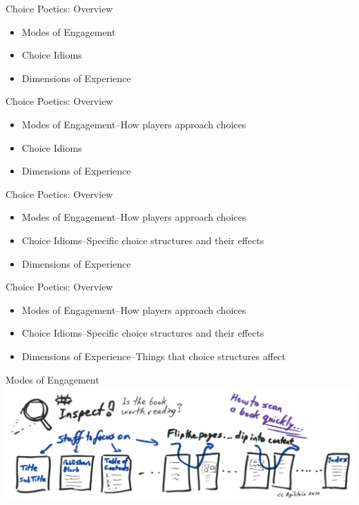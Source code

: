 \documentclass[xcolor=x11names]{beamer}
\begin{document}
\begin{frame}{Choice Poetics: Overview}
  \begin{itemize} 
    \item Modes of Engagement
    \item Choice Idioms
    \item Dimensions of Experience
  \end{itemize} 
\end{frame}

\begin{frame}{Choice Poetics: Overview}
  \begin{itemize} 
    \item Modes of Engagement--How players approach choices
    \item Choice Idioms
    \item Dimensions of Experience
  \end{itemize} 
\end{frame}

\begin{frame}{Choice Poetics: Overview}
  \begin{itemize} 
    \item Modes of Engagement--How players approach choices
    \item Choice Idioms--Specific choice structures and their effects
    \item Dimensions of Experience
  \end{itemize} 
\end{frame}

\begin{frame}{Choice Poetics: Overview}
  \begin{itemize} 
    \item Modes of Engagement--How players approach choices
    \item Choice Idioms--Specific choice structures and their effects
    \item Dimensions of Experience--Things that choice structures affect
  \end{itemize} 
\end{frame}

\begin{frame}{Modes of Engagement}
  \includegraphics[width=\textwidth]{res/scan-book.jpg}
\end{frame}
\end{document}
